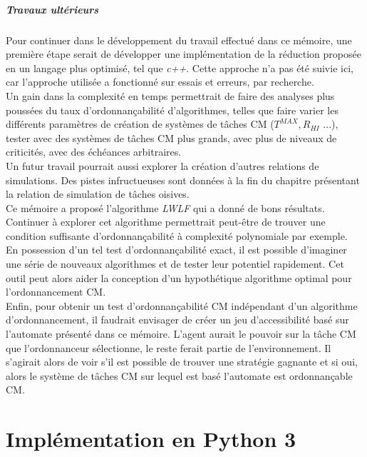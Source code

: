 \documentclass[12pt,a4paper,oneside]{book}
\theoremstyle{break}
\theoremstyle{breakplain}
\begin{document}
\paragraph{Travaux ultérieurs}
Pour continuer dans le développement du travail effectué dans ce mémoire, une première étape serait de développer une implémentation de la réduction proposée en un langage plus optimisé, tel que \textit{c++}. Cette approche n'a pas été suivie ici, car l'approche utilisée a fonctionné sur essais et erreurs, par recherche.\\
Un gain dans la complexité en temps permettrait de faire des analyses plus poussées du taux d'ordonnançabilité d'algorithmes, telles que faire varier les différents paramètres de création de systèmes de tâches CM ($T^{MAX}, R_{HI}$ ...), tester avec des systèmes de tâches CM plus grands, avec plus de niveaux de criticités, avec des échéances arbitraires.\\

Un futur travail pourrait aussi explorer la création d'autres relations de simulations. Des pistes infructueuses sont données à la fin du chapitre présentant la relation de simulation de tâches oisives.\\

Ce mémoire a proposé l'algorithme \textit{LWLF} qui a donné de bons résultats. Continuer à explorer cet algorithme permettrait peut-être de trouver une condition suffisante d'ordonnançabilité à complexité polynomiale par exemple.\\

En possession d'un tel test d'ordonnançabilité exact, il est possible d'imaginer une série de nouveaux algorithmes et de tester leur potentiel rapidement. Cet outil peut alors aider la conception d'un hypothétique algorithme optimal pour l'ordonnancement CM.\\

Enfin, pour obtenir un test d'ordonnançabilité CM indépendant d'un algorithme d'ordonnancement, il faudrait envisager de créer un jeu d'accessibilité basé sur l'automate présenté dans ce mémoire. L'agent aurait le pouvoir sur la tâche CM que l'ordonnanceur sélectionne, le reste ferait partie de l'environnement. Il s'agirait alors de voir s'il est possible de trouver une stratégie gagnante et si oui, alors le système de tâches CM sur lequel est basé l'automate est ordonnançable CM.

\appendix


\chapter{Implémentation en Python 3}
\end{document}
